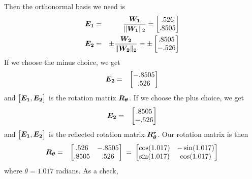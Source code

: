 \documentclass[11pt]{SelfArxOneColBMN}
\begin{document}
\noindent
Then the orthonormal basis we need is
\begin{eqnarray*}
\boldsymbol{E_1} &=& \frac{\boldsymbol{W_1}}{\| \boldsymbol{W_1}\|_2} 
= \begin{bmatrix} .526\\ .8505 \end{bmatrix}\\
\boldsymbol{E_2} &=& \pm \frac{\boldsymbol{W_2}}{\| \boldsymbol{W_2}\|_2} 
= \pm \begin{bmatrix} .8505 \\ -.526 \end{bmatrix}
\end{eqnarray*}
\noindent
If we choose the minus choice, we get
\begin{eqnarray*}
\boldsymbol{E_2} &=& \begin{bmatrix} -.8505 \\ .526 \end{bmatrix}
\end{eqnarray*}
\noindent
and $\begin{bmatrix} \boldsymbol{E_1}, \boldsymbol{E_2} \end{bmatrix}$
is the rotation matrix $\boldsymbol{R_\theta}$.  If we choose the plus choice, we get
\begin{eqnarray*}
\boldsymbol{E_2} &=& \begin{bmatrix} .8505 \\ -.526 \end{bmatrix}
\end{eqnarray*}
\noindent
and $\begin{bmatrix} \boldsymbol{E_1}, \boldsymbol{E_2} \end{bmatrix}$
is the reflected rotation matrix $\boldsymbol{R_\theta^r}$.  Our rotation matrix is then
\begin{eqnarray*}
\boldsymbol{R_\theta} &=& \begin{bmatrix} .526 & -.8505\\ .8505 & .526 \end{bmatrix}
 \: = \:
  \begin{bmatrix} \cos(1.017) & -\sin(1.017)\\ \sin(1.017)& \cos(1.017) \end{bmatrix}
\end{eqnarray*}
\noindent
where $\theta = 1.017$ radians.
As a check, 
\end{document}

